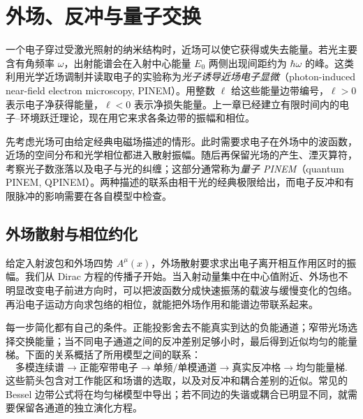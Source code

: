 \chapter{外场、反冲与量子交换}\label{chap:external-pinem}

一个电子穿过受激光照射的纳米结构时，近场可以使它获得或失去能量。若光主要含有角频率 $\omega$，出射能谱会在入射中心能量 $E_0$ 两侧出现间距约为 $\hbar\omega$ 的峰。这类利用光学近场调制并读取电子的实验称为\emph{光子诱导近场电子显微}（photon-induced near-field electron microscopy, PINEM）。用整数 $\ell$ 给这些能量边带编号，$\ell>0$ 表示电子净获得能量，$\ell<0$ 表示净损失能量。上一章已经建立有限时间内的电子--环境跃迁理论，现在用它来求各条边带的振幅和相位。

先考虑光场可由给定经典电磁场描述的情形。此时需要求电子在外场中的波函数，近场的空间分布和光学相位都进入散射振幅。随后再保留光场的产生、湮灭算符，考察光子数涨落以及电子与光的纠缠；这部分通常称为\emph{量子 PINEM}（quantum PINEM, QPINEM）。两种描述的联系由相干光的经典极限给出，而电子反冲和有限脉冲的影响需要在各自模型中检查。\cite{Feist2015Nature,Wang2020Cavity,Dahan2021Science,Ruimy2025Perspective}

\section{外场散射与相位约化}

给定入射波包和外场四势 $A^\mu(x)$，外场散射要求求出电子离开相互作用区时的振幅。我们从 Dirac 方程的传播子开始。当入射动量集中在中心值附近、外场也不明显改变电子前进方向时，可以把波函数分成快速振荡的载波与缓慢变化的包络。再沿电子运动方向求包络的相位，就能把外场作用和能谱边带联系起来。

每一步简化都有自己的条件。正能投影舍去不能真实到达的负能通道；窄带光场选择交换能量；当不同电子通道之间的反冲差别足够小时，最后得到近似均匀的能量梯。下面的关系概括了所用模型之间的联系：
\begin{equation}
\boxed{
\text{多模连续谱}
\longrightarrow
\text{正能窄带电子}
\longrightarrow
\text{单频/单模通道}
\longrightarrow
\text{真实反冲格}
\longrightarrow
\text{均匀能量梯}.}
\label{eq:pinem_reduction_spine}
\end{equation}
这些箭头包含对工作能区和场谱的选取，以及对反冲和耦合差别的近似。常见的 Bessel 边带公式将在均匀梯模型中导出；若不同边的失谐或耦合已明显不同，就需要保留各通道的独立演化方程。

